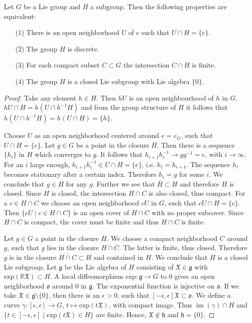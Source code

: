 \documentclass[envcountsect,runningheads]{llncs}
\DeclareMathOperator{\Ima}{im}
\begin{document}
\begin{propositionsec}{\cite[p.17]{van2003lie}} Let $G$ be a Lie group and $H$ a subgroup. Then the following properties are equivalent:
\begin{enumerate}
	\item[(1)] There is an open neighborhood $U$ of $e$ such that $U \cap H = \{e\}$.
	\item[(2)] The group $H$ is discrete.
	\item[(3)] For each compact subset $C \subset G$ the intersection $C \cap H$ is finite.
	\item[(4)] The group $H$ is a closed Lie subgroup with Lie algebra $\{0\}$.
\end{enumerate}
\end{propositionsec}
\begin{proof}Take any element $h \in H$. Then $hU$ is an open neighbourhood of $h$ in $G$. $hU \cap H = h(U\cap h^{-1}H)$ and from the group structure of $H$ it follows that $h(U\cap h^{-1}H) = h(U \cap H) = \{h\}$.

Choose $U$ as an open neighborhood centered around $e = e_G$, such that $U \cap H = \{e\}$. Let $g \in G$ be a point in the closure $\overline{H}$. Then there is a sequence $\{h_i\}$ in $H$ which converges to $g$. It follows that $h_{i+1}h_i^{-1} \rightarrow gg^{-1} = e$, with $i \rightarrow \infty$. For an $i$ large enough, $h_{i+1}h_i^{-1} \in U \cap H = \{e\}$, i.e. $h_i = h_{i+1}$. The sequence $h_i$ becomes stationary after a certain index. Therefore $h_i = g$ for some $i$. We conclude that $g \in H$ for any $g$. Further we see that $\overline{H} \subset H$ and therefore $H$ is closed. Since $H$ is closed, the intersection $H \cap C$ is also closed, thus compact. For a $c \in H \cap C$ we choose an open neighborhood $cU$ in $G$, such that $cU \cap H = \{c\}$. Then $\{cU \; | \; c \in H \cap C\}$ is an open cover of $H \cap C$ with no proper subcover. Since $H \cap C$ is compact, the cover must be finite and thus $H \cap C$ is finite.

Let $g \in G$ a point in the closure $\overline{H}$. We choose a compact neighborhood $C$ around $g$, such that $g$ lies in the closure $\overline{H \cap C}$. The latter is finite, thus closed. Therefore $g$ is in the closure $\overline{H \cap C} \subset H$ and contained in $H$. We conclude that $H$ is a closed Lie subgroup. Let $\mathfrak{g}$ be the Lie algebra of $H$ consisting of $\mathfrak{X} \in \mathfrak{g}$ with $\text{exp}(\mathbb{R}\mathfrak{X}) \subset H$. A local diffeomorphism $\text{exp}: \mathfrak{g} \rightarrow G$ to $0$ gives an open neighborhood $\mathfrak{o}$ around $0$ in $\mathfrak{g}$. The exponential function is injective on $\mathfrak{o}$. If we take $\mathfrak{X} \in \mathfrak{g} \setminus \{0\}$, then there is an $\epsilon > 0$, such that $[-\epsilon, \epsilon]\mathfrak{X} \subset \mathfrak{o}$. We define a curve $\gamma: [\epsilon,\epsilon] \rightarrow G$, $t \mapsto \text{exp}(t\mathfrak{X})$, with compact image. Thus $\Ima(\gamma) \cap H$ and $\{t \in [-\epsilon,\epsilon] \; | \; \text{exp}(t \mathfrak{X}) \in H\}$ are finite. Hence, $\mathfrak{X} \notin \mathfrak{h}$ and $\mathfrak{h} = \{0\}$. 


\end{proof}
\end{document}
